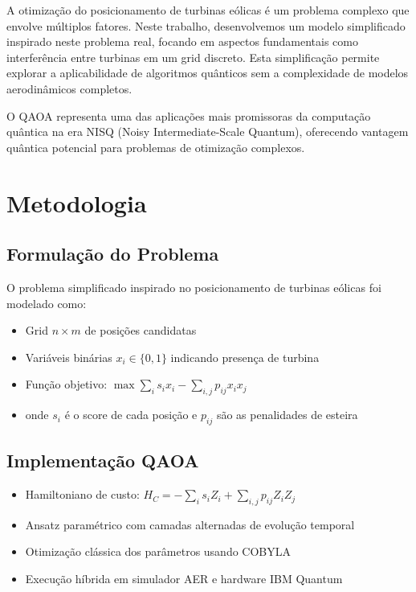 \documentclass[12pt,a4paper]{article}
\begin{document}
A otimização do posicionamento de turbinas eólicas é um problema complexo que envolve múltiplos fatores. Neste trabalho, desenvolvemos um modelo simplificado inspirado neste problema real, focando em aspectos fundamentais como interferência entre turbinas em um grid discreto. Esta simplificação permite explorar a aplicabilidade de algoritmos quânticos sem a complexidade de modelos aerodinâmicos completos.

O QAOA representa uma das aplicações mais promissoras da computação quântica na era NISQ (Noisy Intermediate-Scale Quantum), oferecendo vantagem quântica potencial para problemas de otimização complexos.

\section{Metodologia}

\subsection{Formulação do Problema}

O problema simplificado inspirado no posicionamento de turbinas eólicas foi modelado como:
\begin{itemize}
    \item Grid $n \times m$ de posições candidatas
    \item Variáveis binárias $x_i \in \{0,1\}$ indicando presença de turbina
    \item Função objetivo: $\max \sum_i s_i x_i - \sum_{i,j} p_{ij} x_i x_j$
    \item onde $s_i$ é o score de cada posição e $p_{ij}$ são as penalidades de esteira
\end{itemize}

\subsection{Implementação QAOA}

\begin{itemize}
    \item Hamiltoniano de custo: $H_C = -\sum_i s_i Z_i + \sum_{i,j} p_{ij} Z_i Z_j$
    \item Ansatz paramétrico com camadas alternadas de evolução temporal
    \item Otimização clássica dos parâmetros usando COBYLA
    \item Execução híbrida em simulador AER e hardware IBM Quantum
\end{itemize}
\end{document}
